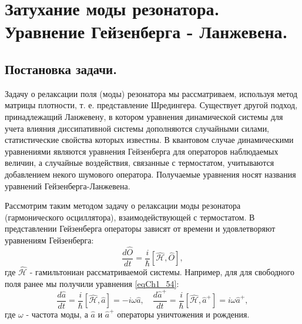 \section{Затухание моды резонатора. Уравнение Гейзенберга - Ланжевена.}

\subsection{Постановка задачи.}
Задачу о релаксации поля (моды) резонатора мы рассматриваем, используя
метод матрицы плотности, т. е. представление Шредингера. Существует
другой подход, принадлежащий Ланжевену, в котором уравнения
динамической системы для учета влияния диссипативной системы
дополняются случайными силами, статистические свойства которых
известны. В квантовом случае динамическими уравнениями являются
уравнения Гейзенберга для операторов наблюдаемых величин, а случайные
воздействия, связанные с термостатом, учитываются добавлением некого
шумового оператора. Получаемые уравнения носят названия уравнений
Гейзенберга-Ланжевена.

Рассмотрим таким методом задачу о релаксации моды резонатора
(гармонического осциллятора), взаимодействующей с термостатом. В
представлении Гейзенберга операторы зависят от времени и удовлетворяют
уравнениям Гейзенберга:
\begin{equation}
\frac{d \hat{O}}{dt} = \frac{i}{\hbar}
\left[\hat{\mathcal{H}}, \hat{O}\right],
\nonumber
\end{equation}
где $\hat{\mathcal{H}}$ - гамильтониан рассматриваемой
системы. Например, для для свободного поля ранее мы получили уравнения
\eqref{eqCh1_54}:
\begin{equation}
\frac{d \hat{a}}{d t} = \frac{i}{\hbar}\left[\hat{\mathcal{H}},
  \hat{a}\right] = -i \omega \hat{a}, \quad
\frac{d \hat{a}^{+}}{dt} = \frac{i}{\hbar}\left[\hat{\mathcal{H}},
  \hat{a}^{+}\right] = i \omega \hat{a}^{+},
\nonumber
\end{equation}
где $\omega$ - частота моды, а $\hat{a}$ и $\hat{a}^{+}$ операторы
уничтожения и рождения.



